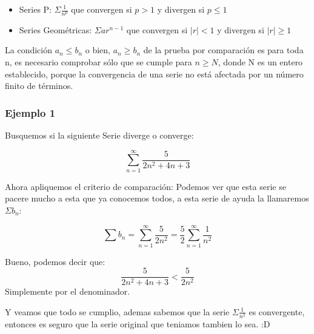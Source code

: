 \documentclass[12pt]{report}                                %
\begin{document}
        \begin{itemize}
            \item Series P: $\Sigma \frac{1}{n^p}$ que convergen si $p>1$ y divergen si $p\leq 1$
            \item Series Geométricas: $\Sigma ar^{n-1}$ que convergen si $|r|<1$ y divergen si $|r|\geq 1$
        \end{itemize}

        La condición $a_n \leq b_n$ o bien, $a_n \geq b_n$ de la prueba por comparación es para toda n, es
        necesario comprobar sólo que se cumple para $n \geq N$, donde N es un entero establecido, porque
        la convergencia de una serie no está afectada por un número finito de términos.

            \subsubsection{Ejemplo 1}
            Busquemos si la siguiente Serie diverge o converge:

            \begin{equation*}
                \sum_{n=1}^{\infty} \frac{5}{2n^2 +4n +3}
            \end{equation*}

            Ahora apliquemos el criterio de comparación: Podemos ver que esta serie se pacere mucho a esta
            que ya conocemos todos, a esta serie de ayuda la llamaremos $\Sigma b_n$:

            \begin{equation*}
                \sum b_n = \sum_{n=1}^{\infty} \frac{5}{2n^2} = \frac{5}{2}\sum_{n=1}^{\infty} \frac{1}{n^2}
            \end{equation*}

            Bueno, podemos decir que:
            \begin{equation*}
                \frac{5}{2n^2 +4n +3} < \frac{5}{2n^2}
            \end{equation*}
            Simplemente por el denominador.

            Y veamos que todo se cumplio, ademas sabemos que la serie $\Sigma \frac{1}{n^2}$ es convergente,
            entonces es seguro que la serie original que teniamos tambien lo sea. :D



    \clearpage
\end{document}
